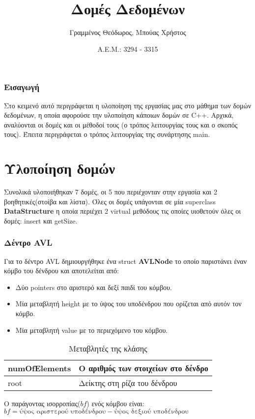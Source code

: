 \documentclass[12pt,a4paper]{article}
\author{Γραμμένος Θεόδωρος, Μπούας Χρήστος}
\title{Δομές Δεδομένων}
\date{Α.Ε.Μ.: 3294 - 3315}
\begin{document}
    \maketitle
    \tableofcontents
    \section*{Εισαγωγή}
    Στο κειμενό αυτό περιγράφεται η υλοποίηση της εργασίας μας στο μάθημα των δομών δεδομένων,
    η οποία αφορούσε την υλοποίηση κάποιων δομών σε C++. Αρχικά, αναλύονται οι δομές και οι μέθοδοί τους (ο
    τρόπος λειτουργίας τους και ο σκοπός τους). Έπειτα περιγράφεται ο τρόπος λειτουργίας της συνάρτησης main.
    \part*{Υλοποίηση δομών}
    Συνολικά υλοποιήθηκαν 7 δομές, οι 5 που περιέχονταν στην εργασία και 2 βοηθητικές(στοίβα και λίστα). Όλες οι
    δομές υπάγονται σε μία superclass \textbf{DataStructure} η οποία περιέχει 2 virtual μεθόδους τις οποίες
    υιοθετούν όλες οι δομές: insert και getSize.
    \section{Δέντρο AVL}
    Για το δέντρο AVL δημιουργήθηκε ένα struct \textbf{AVLNode} το οποίο παριστάνει έναν κόμβο του δένδρου και αποτελείται από:
        \begin{itemize}
            \item Δύο pointers στο αριστερό και δεξί παιδί του κόμβου.
            \item Μία μεταβλητή height με το ύψος του υποδένδρου που ορίζεται από αυτόν τον κόμβο.
            \item Μία μεταβλητή value με το περιεχόμενο του κόμβου.
        \end{itemize}
    \begin{table}[h!]
        \centering
        \begin{tabular}{|l|l|}
        \hline
        numOfElements & Ο αριθμός των στοιχείων στο δένδρο \\ \hline
        root          & Δείκτης στη ρίζα του δένδρου       \\ \hline
        \end{tabular}
        \caption{Μεταβλητές της κλάσης}
    \end{table}
    Ο παράγοντας ισορροπίας($bf$) ενός κόμβου είναι:\\ $bf = \text{ύψος αριστερού υποδένδρου} - \text{ύψος δεξιού υποδένδρου}$ 
\end{document}
